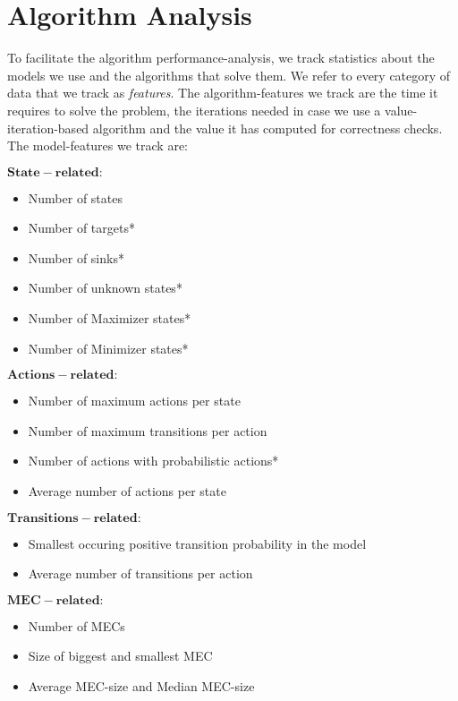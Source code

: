 \chapter{Algorithm Analysis} \label{ch:analysis}

To facilitate the algorithm performance-analysis, we track statistics about the models we use and the algorithms that solve them. 
We refer to every category of data that we track as \emph{features}.
The algorithm-features we track are the time it requires to solve the problem, the iterations needed in case we use a value-iteration-based algorithm and the value it has computed for correctness checks.
The model-features we track are:

$\mathbf{State-related:}$
\begin{itemize}
\item Number of states
\item Number of targets*
\item Number of sinks*
\item Number of unknown states*
\item Number of Maximizer states*
\item Number of Minimizer states*
\end{itemize}

$\mathbf{Actions-related:}$
\begin{itemize}
\item Number of maximum actions per state
\item Number of maximum transitions per action
\item Number of actions with probabilistic actions*
\item Average number of actions per state
\end{itemize}

$\mathbf{Transitions-related:}$
\begin{itemize}
\item Smallest occuring positive transition probability in the model
\item Average number of transitions per action
\end{itemize} 

$\mathbf{MEC-related:}$
\begin{itemize}
\item Number of MECs
\item Size of biggest and smallest MEC
\item Average MEC-size and Median MEC-size
\end{itemize}

